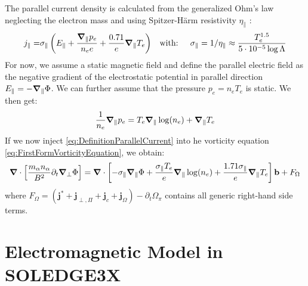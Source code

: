 The parallel current density is calculated from the generalized Ohm's law neglecting the electron mass and using Spitzer-Härm resistivity $\eta_\parallel$ \cite{SpitzerResistivity}:
 \begin{align} 
 	\label{eq:DefinitionParallelCurrent}
 	j_\parallel =& \sigma_\parallel \left(E_\parallel + \frac{\grad_\parallel p_e}{n_ee} + \frac{0.71}{e}\grad_\parallel T_e\right) & \text{with: }&& \sigma_\parallel = 1/\eta_\parallel \approx  \frac{T_e^{1.5}}{5\cdot 10^{-5}\log\Lambda}
 \end{align}
 For now, we assume a static magnetic field and define the parallel electric field as the negative gradient of the electrostatic potential in parallel direction $E_\parallel=-\grad_\parallel\Phi$. We can further assume that the pressure $p_e=n_eT_e$ is static. We then get:  
 $$\frac{1}{n_e}\grad_\parallel p_e = T_e\grad_\parallel\log(n_e) + \grad_\parallel T_e$$
 If we now inject \autoref{eq:DefinitionParallelCurrent} into he vorticity equation \autoref{eq:FirstFormVorticityEquation}, we obtain: 
\begin{equation}
	\label{eq:ElectrostaticVorticityEquation}
	 \grad\cdot\left[\frac{m_\alpha n_\alpha}{ B^2}\partial_t\grad_\perp\Phi\right]  = \grad\cdot\left[-\sigma_\parallel \grad_\parallel\Phi + \frac{\sigma_\parallel T_e}{e}\grad_\parallel\log(n_e) + \frac{1.71\sigma_\parallel}{e}\grad_\parallel T_e\right]\mathbf{b} + F_\Omega
\end{equation}
where $F_\Omega = \left(\mathbf{j}^* + \mathbf{j}_{\perp,\Pi} + \mathbf{j}_{c} + \mathbf{j}_\Omega\right) - \partial_t \Omega_\pi$ contains all generic right-hand side terms. \\



\section{Electromagnetic Model in SOLEDGE3X}

